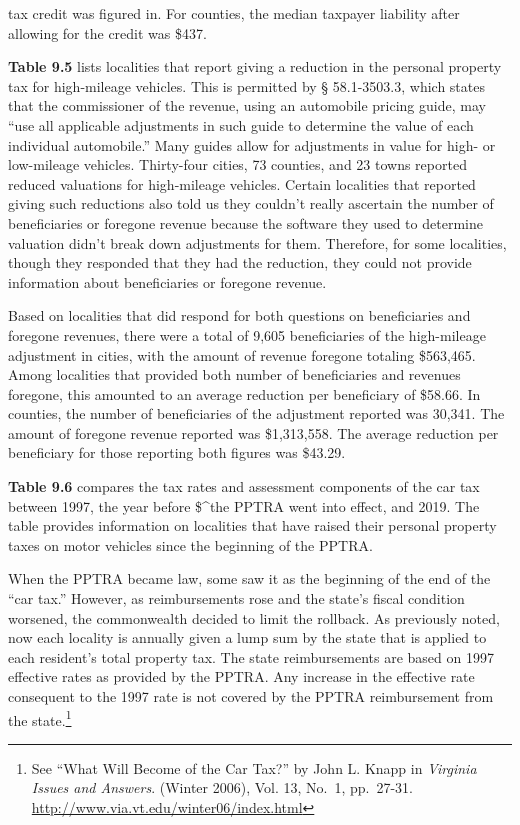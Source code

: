 \documentclass[
]{book}
\newenvironment{Shaded}{\begin{snugshade}}{\end{snugshade}}
\newcommand{\CommentTok}[1]{\textcolor[rgb]{0.56,0.35,0.01}{\textit{#1}}}
\begin{document}
\begin{Shaded}
\end{Shaded}

tax credit was figured in. For counties, the median taxpayer liability after allowing for the credit was \$437.

\textbf{Table 9.5} lists localities that report giving a reduction in the personal property tax for high-mileage vehicles. This is permitted by § 58.1-3503.3, which states that the commissioner of the revenue, using an automobile pricing guide, may ``use all applicable adjustments in such guide to determine the value of each individual automobile.'' Many guides allow for adjustments in value for high- or low-mileage vehicles. Thirty-four cities, 73 counties, and 23 towns reported reduced valuations for high-mileage vehicles. Certain localities that reported giving such reductions also told us they couldn't really ascertain the number of beneficiaries or foregone revenue because the software they used to determine valuation didn't break down adjustments for them. Therefore, for some localities, though they responded that they had the reduction, they could not provide information about beneficiaries or foregone revenue.

Based on localities that did respond for both questions on beneficiaries and foregone revenues, there were a total of 9,605 beneficiaries of the high-mileage adjustment in cities, with the amount of revenue foregone totaling \$563,465. Among localities that provided both number of beneficiaries and revenues foregone, this amounted to an average reduction per beneficiary of \$58.66. In counties, the number of beneficiaries of the adjustment reported was 30,341. The amount of foregone revenue reported was \$1,313,558. The average reduction per beneficiary for those reporting both figures was \$43.29.

\textbf{Table 9.6} compares the tax rates and assessment components of the car tax between 1997, the year before \$\^{}the PPTRA went into effect, and 2019. The table provides information on localities that have raised their personal property taxes on motor vehicles since the beginning of the PPTRA.

When the PPTRA became law, some saw it as the beginning of the end of the ``car tax.'' However, as reimbursements rose and the state's fiscal condition worsened, the commonwealth decided to limit the rollback. As previously noted, now each locality is annually given a lump sum by the state that is applied to each resident's total property tax. The state reimbursements are based on 1997 effective rates as provided by the PPTRA. Any increase in the effective rate consequent to the 1997 rate is not covered by the PPTRA reimbursement from the state.\footnote{See ``What Will Become of the Car Tax?'' by John L. Knapp in \emph{Virginia Issues and Answers}. (Winter 2006), Vol. 13, No.~1, pp.~27-31.
  \url{http://www.via.vt.edu/winter06/index.html}}
\end{document}
